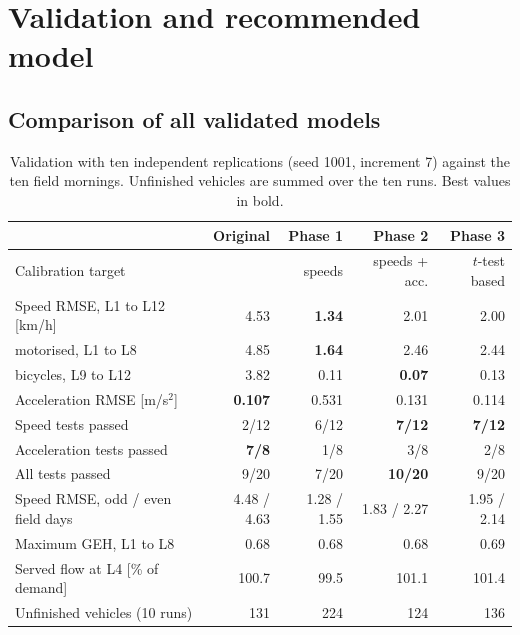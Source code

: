 \documentclass[11pt,a4paper]{article}
\begin{document}
\section{Validation and recommended model}
\label{sec:validation}

\subsection{Comparison of all validated models}

\begin{table}[!htb]
\centering
\caption[Validation of all models]{Validation with ten independent replications (seed 1001,
increment 7) against the ten field mornings. Unfinished vehicles are summed over the ten runs.
Best values in bold.}
\label{tab:summary}
\small
\begin{tabular}{lrrrr}
\toprule
& \textbf{Original} & \textbf{Phase 1} & \textbf{Phase 2} & \textbf{Phase 3}\\
\midrule
Calibration target & & speeds & speeds + acc. & $t$-test based\\
\midrule
Speed RMSE, L1 to L12 [km/h]      & 4.53 & \textbf{1.34} & 2.01 & 2.00\\
\quad motorised, L1 to L8         & 4.85 & \textbf{1.64} & 2.46 & 2.44\\
\quad bicycles, L9 to L12         & 3.82 & 0.11 & \textbf{0.07} & 0.13\\
Acceleration RMSE [m/s$^2$]       & \textbf{0.107} & 0.531 & 0.131 & 0.114\\
\midrule
Speed tests passed                & 2/12 & 6/12 & \textbf{7/12} & \textbf{7/12}\\
Acceleration tests passed         & \textbf{7/8} & 1/8 & 3/8 & 2/8\\
All tests passed                  & 9/20 & 7/20 & \textbf{10/20} & 9/20\\
\midrule
Speed RMSE, odd / even field days & 4.48 / 4.63 & 1.28 / 1.55 & 1.83 / 2.27 & 1.95 / 2.14\\
Maximum GEH, L1 to L8             & 0.68 & 0.68 & 0.68 & 0.69\\
Served flow at L4 [\% of demand]  & 100.7 & 99.5 & 101.1 & 101.4\\
Unfinished vehicles (10 runs)     & 131 & 224 & 124 & 136\\
\bottomrule
\end{tabular}
\end{table}
\end{document}
